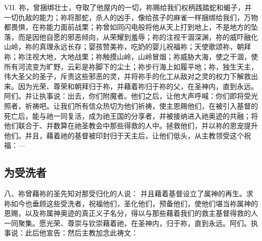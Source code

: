 VII. 祢，曾捆绑壮士，夺取了他屋内的一切，祢赐给我们权柄践踏蛇和蝎子，并一切仇敌的能力；祢将那蛇，杀人的凶手，像给孩子的麻雀一样捆绑给我们，万物都畏惧，在祢能力面前战栗；祢曾如同闪电般将他从天上打到地上，不是地方的坠落，而是因他自愿的邪恶倾向，从荣耀到羞辱；祢的注视干涸深渊，祢的威吓融化山岭，祢的真理永远长存；婴孩赞美祢，吃奶的婴儿祝福祢；天使歌颂祢，朝拜祢；祢注视大地，大地战栗；祢触摸山岭，山岭冒烟；祢威胁大海，使之干涸，使所有河流变为旷野，云彩是祢脚下的尘土；祢步行海上如履平地；祢，独生天主，伟大圣父的圣子，斥责这些邪恶的灵，并将祢手的化工从敌对之灵的权力下解救出来。因为光荣、尊荣和朝拜归于祢，并藉着祢归于祢的父，在圣神内，直到永远。阿们。并让执事说：出去，你们附魔者。他们之后，让他大声呼喊：你们即将受光照者，祈祷吧。让我们所有信众热切为他们祈祷，使主恩赐他们，在被引入基督的死亡后，能与祂一同复活，成为祂王国的分享者，并被接纳进入祂奥迹的共融；将他们联合于、并数算在祂圣教会中那些得救的人中。拯救他们，并以祢的恩宠提升他们。并且，藉着祂的基督被印封归于天主后，让他们低头，从主教领受这个祝福：—\par


\subsection{为受洗者}

八、祢曾藉祢的圣先知对那受归化的人说：  并且藉着基督设立了属神的再生。求祢如今也垂顾这些受洗者，祝福他们，圣化他们，预备他们，使他们堪当祢属神的恩赐，以及祢属神奥迹的真正义子名分，得以与那些藉着我们的救主基督得救的人一同聚集。愿光荣、尊崇与钦崇藉着祂，在圣神内，归于祢，直到永远。阿们。执事说：此后他宣告：然后主教加念此祷文：\newline{}\par

